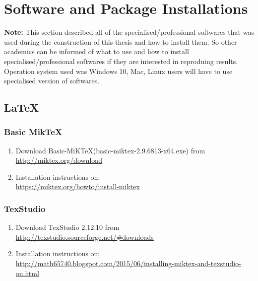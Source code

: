 \chapter{Software and Package Installations} 
\textbf{Note:} This section described all of the specialised/professional softwares that was used during the construction of this thesis and how to install them. So other academics can be informed of what to use and how to install specialised/professional softwares if they are interested in reproduing results. Operation system used was Windows 10, Mac, Linux users will have to use specialised version of softwares. 

\section*{\LaTeX}
	\subsection*{Basic MikTeX}
		\begin{enumerate}
		\item	Download Basic-MiK\TeX (basic-miktex-2.9.6813-x64.exe) from\\
		\href{http://miktex.org/download}{http://miktex.org/download}
		\item	Installation instructions on: \\ \href{https://miktex.org/howto/install-miktex}{https://miktex.org/howto/install-miktex}
		\end{enumerate}
	\subsection*{TexStudio}
		\begin{enumerate}
		\item	Download TexStudio 2.12.10 from\\
		\href{http://texstudio.sourceforge.net/\#downloads}{http://texstudio.sourceforge.net/\#downloads}
		\item	Installation instructions on: \\
		\href{http://math65740.blogspot.com/2015/06/installing-miktex-and-texstudio-on.html}{http://math65740.blogspot.com/2015/06/installing-miktex-and-texstudio-on.html}
		\end{enumerate}
	
